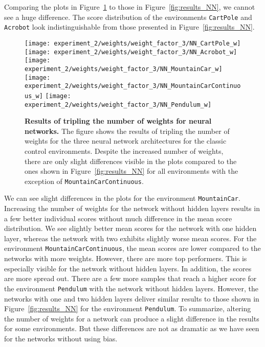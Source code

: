 Comparing the plots in Figure~\ref{fig:results_NN_weights} to those in Figure~\ref{fig:results_NN}, we cannot see a huge difference. The score distribution of the environments \verb|CartPole| and \verb|Acrobot| look indistinguishable from those presented in Figure~\ref{fig:results_NN}.
\begin{figure}[!ht]
  \centering
\texttt{[image: experiment\_2/weights/weight\_factor\_3/NN\_CartPole\_w]}
\texttt{[image: experiment\_2/weights/weight\_factor\_3/NN\_Acrobot\_w]}
\texttt{[image: experiment\_2/weights/weight\_factor\_3/NN\_MountainCar\_w]}
\texttt{[image: experiment\_2/weights/weight\_factor\_3/NN\_MountainCarContinuous\_w]}
\texttt{[image: experiment\_2/weights/weight\_factor\_3/NN\_Pendulum\_w]}
\caption[Results of tripling the number of weights for neural networks]{
  \textbf{Results of tripling the number of weights for neural networks.}
   The figure shows the results of tripling the number of weights for the three neural network architectures for the classic control environments. Despite the increased number of weights, there are only slight differences visible in the plots compared to the ones shown in Figure~\ref{fig:results_NN} for all environments with the exception of \texttt{MountainCarContinuous}.
}
\label{fig:results_NN_weights}
\end{figure}
We can see slight differences in the plots for the environment \verb|MountainCar|. Increasing the number of weights for the network without hidden layers results in a few better individual scores without much difference in the mean score distribution. We see slightly better mean scores for the network with one hidden layer, whereas the network with two exhibits slightly worse mean scores. For the environment \verb|MountainCarContinuous|, the mean scores are lower compared to the networks with more weights. However, there are more top performers.  This is especially visible for the network without hidden layers. In addition, the scores are more spread out. There are a few more samples that reach a higher score for the environment \verb|Pendulum| with the network without hidden layers. However, the networks with one and two hidden layers deliver similar results to those shown in Figure~\ref{fig:results_NN} for the environment \verb|Pendulum|. To summarize, altering the number of weights for a network can produce a slight difference in the results for some environments. But these differences are not as dramatic as we have seen for the networks without using bias.

